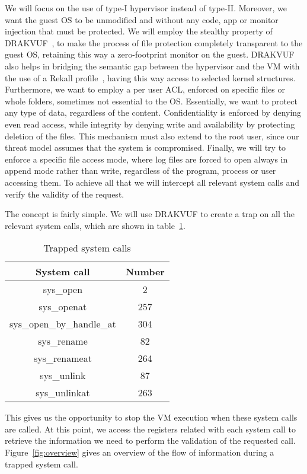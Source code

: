 \par We will focus on the use of type-I hypervisor instead of type-II. Moreover, we want the guest \ac{OS} to be unmodified and without any code, app or monitor injection that must be protected. We will employ the stealthy property of DRAKVUF~\cite{lengyel2014drakvuf}, to make the process of file protection completely transparent to the guest \ac{OS}, retaining this way a zero-footprint monitor on the guest. DRAKVUF also helps in bridging the semantic gap between the hypervisor and the \ac{VM} with the use of a Rekall profile~\cite{rekall}, having this way access to selected kernel structures. Furthermore, we want to employ a per user \ac{ACL}, enforced on specific files or whole folders, sometimes not essential to the \ac{OS}. Essentially, we want to protect any type of data, regardless of the content. Confidentiality is enforced by denying even read access, while integrity by denying write and availability by protecting deletion of the files. This mechanism must also extend to the root user, since our threat model assumes that the system is compromised. Finally, we will try to enforce a specific file access mode, where log files are forced to open always in append mode rather than write, regardless of the program, process or user accessing them. To achieve all that we will intercept all relevant system calls and verify the validity of the request. 

\par The concept is fairly simple. We will use DRAKVUF to create a trap on all the relevant system calls, which are shown in table~\ref{tbl:syscalls}.

\begin{table}[h]
	\centering
	\caption{Trapped system calls}
	\label{tbl:syscalls}
	\begin{tabular}{cc}
		\toprule
		System call & Number \\
		\hline
		sys\_open & 2 \\ sys\_openat & 257 \\ sys\_open\_by\_handle\_at & 304 \\
		sys\_rename & 82 \\ sys\_renameat & 264 \\ 
		sys\_unlink & 87 \\ sys\_unlinkat & 263 \\
		\bottomrule
\end{tabular}	
\end{table}

This gives us the opportunity to stop the \ac{VM} execution when these system calls are called. At this point, we access the registers related with each system call to retrieve the information we need to perform the validation of the requested call. Figure~\ref{fig:overview} gives an overview of the flow of information during a trapped system call. 

